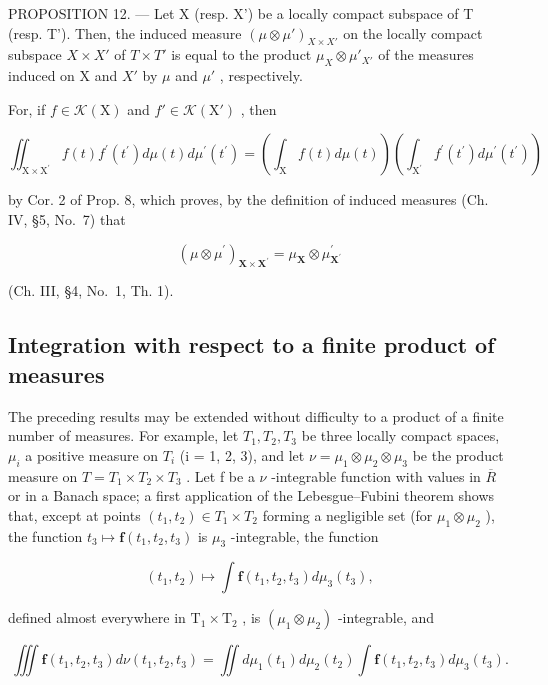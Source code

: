 PROPOSITION 12. --- Let X (resp. X') be a locally compact subspace of T (resp. T'). Then, the induced measure \((\mu \otimes \mu')_{X \times X'}\) on the locally compact subspace \(X \times X'\) of \(T \times T'\) is equal to the product \(\mu_{X} \otimes \mu'_{X'}\) of the measures induced on X and \(X'\) by \(\mu\) and \(\mu'\) , respectively.

For, if \(f \in \mathcal{K}(\mathrm{X})\) and \(f' \in \mathcal{K}(\mathrm{X}')\) , then

\[
\iint_ {\mathrm{X} \times \mathrm{X} ^ {\prime}} f (t) f ^ {\prime} (t ^ {\prime}) d \mu (t) d \mu^ {\prime} (t ^ {\prime}) = \left(\int_ {\mathrm{X}} f (t) d \mu (t)\right) \left(\int_ {\mathrm{X} ^ {\prime}} f ^ {\prime} (t ^ {\prime}) d \mu^ {\prime} (t ^ {\prime})\right)
\]

by Cor. 2 of Prop. 8, which proves, by the definition of induced measures (Ch. IV, §5, No.~7) that

\[
(\mu \otimes \mu^ {\prime}) _ {\mathbf {X} \times \mathbf {X} ^ {\prime}} = \mu_ {\mathbf {X}} \otimes \mu_ {\mathbf {X} ^ {\prime}} ^ {\prime}
\]

(Ch. III, §4, No.~1, Th. 1).

\subsection{Integration with respect to a finite product of measures}

The preceding results may be extended without difficulty to a product of a finite number of measures. For example, let \(T_{1}, T_{2}, T_{3}\) be three locally compact spaces, \(\mu_{i}\) a positive measure on \(T_{i}\) (i = 1, 2, 3), and let \(\nu = \mu_{1} \otimes \mu_{2} \otimes \mu_{3}\) be the product measure on \(T = T_{1} \times T_{2} \times T_{3}\) . Let f be a \(\nu\) -integrable function with values in \(\overline{R}\) or in a Banach space; a first application of the Lebesgue--Fubini theorem shows that, except at points \((t_{1}, t_{2}) \in T_{1} \times T_{2}\) forming a negligible set (for \(\mu_{1} \otimes \mu_{2}\) ), the function \(t_{3} \mapsto \mathbf{f}(t_{1}, t_{2}, t_{3})\) is \(\mu_{3}\) -integrable, the function

\[
(t _ {1}, t _ {2}) \mapsto \int \mathbf {f} (t _ {1}, t _ {2}, t _ {3}) d \mu_ {3} (t _ {3}),
\]

defined almost everywhere in \(\mathrm{T}_1\times \mathrm{T}_2\) , is \((\mu_{1}\otimes \mu_{2})\) -integrable, and

\[
\iiint \mathbf {f} (t _ {1}, t _ {2}, t _ {3}) d \nu (t _ {1}, t _ {2}, t _ {3}) = \iint d \mu_ {1} (t _ {1}) d \mu_ {2} (t _ {2}) \int \mathbf {f} (t _ {1}, t _ {2}, t _ {3}) d \mu_ {3} (t _ {3}).
\]

